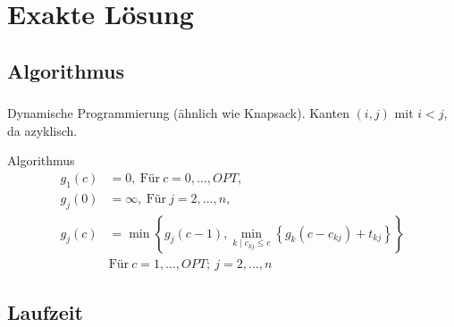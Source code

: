 \documentclass{beamer}
\begin{document}
\section{Exakte Lösung}
\subsection{Algorithmus}
\begin{frame}
   \frametitle{\insertsection}
   \framesubtitle{\insertsubsection}

   Dynamische Programmierung (ähnlich wie Knapsack). Kanten $(i,j)$ mit $i < j$,
   da azyklisch.
   \begin{block}{Algorithmus}
      \begin{align*}
         g_1(c) & =  0, ~ \text{Für} ~ c = 0,\ldots,OPT, \\
         g_j(0) & =  \infty, ~ \text{Für} ~ j = 2,\ldots,n, \\
         g_j(c) & =  \min\left\{g_j(c-1), \min_{k \mid c_{kj} \le
   c}\left\{g_k(c-c_{kj}) + t_{kj}\right\}\right\} \\
                & \text{Für} ~ c= 1,\ldots,OPT; ~ j = 2,\ldots,n
\end{align*}
   \end{block}
\end{frame}

\subsection{Laufzeit}
\end{document}
